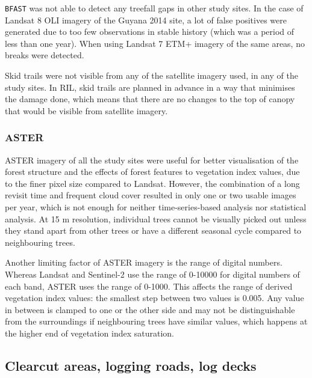 \documentclass[a4paper,12pt]{scrbook}
\begin{document}
\texttt{BFAST} was not able to detect any treefall gaps in other study sites. In the case of Landsat 8 \ac{OLI} imagery of the Guyana 2014 site, a lot of false positives were generated due to too few observations in stable history (which was a period of less than one year). When using Landsat 7 \ac{ETM+} imagery of the same areas, no breaks were detected.

Skid trails were not visible from any of the satellite imagery used, in any of the study sites. In \ac{RIL}, skid trails are planned in advance in a way that minimises the damage done, which means that there are no changes to the top of canopy that would be visible from satellite imagery.


\subsubsection{ASTER}


\ac{ASTER} imagery of all the study sites were useful for better visualisation of the forest structure and the effects of forest features to vegetation index values, due to the finer pixel size compared to Landsat. However, the combination of a long revisit time and frequent cloud cover resulted in only one or two usable images per year, which is not enough for neither time-series-based analysis nor statistical analysis. At 15 m resolution, individual trees cannot be visually picked out unless they stand apart from other trees or have a different seasonal cycle compared to neighbouring trees.

Another limiting factor of \ac{ASTER} imagery is the range of digital numbers. Whereas Landsat and Sentinel-2 use the range of 0-10000 for digital numbers of each band, \ac{ASTER} uses the range of 0-1000. This affects the range of derived vegetation index values: the smallest step between two values is 0.005. Any value in between is clamped to one or the other side and may not be distinguishable from the surroundings if neighbouring trees have similar values, which happens at the higher end of vegetation index saturation.

\subsection{Clearcut areas, logging roads, log decks}
\end{document}
